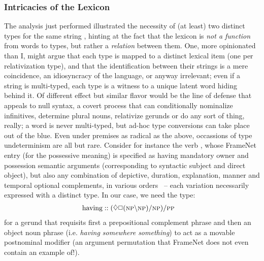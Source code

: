 \subsubsection{Intricacies of the Lexicon}
The analysis just performed illustrated the necessity of (at least) two distinct types for the same string , hinting at the fact that the lexicon is \textit{not a function} from words to types, but rather a \textit{relation} between them.
One, more opinionated than I, might argue that each type is mapped to a distinct lexical item (one per relativization type), and that the identification between their strings is a mere coincidence, an idiosyncracy of the language, or anyway irrelevant; even if a string is multi-typed, each type is a witness to a unique latent word hiding behind it.
Of different effect but similar flavor would be the line of defense that appeals to null syntax, a covert process that can conditionally nominalize infinitives, determine plural nouns, relativize gerunds or do any sort of thing, really; a word is never multi-typed, but ad-hoc type conversions can take place out of the blue.
Even under premises as radical as the above, occassions of type undeterminism are all but rare.
Consider for instance the verb , whose FrameNet entry (for the possessive meaning) is specified as having mandatory owner and possession semantic arguments (corresponding to syntactic subject and direct object), but also any combination of depictive, duration, explanation, manner and temporal optional complements, in various orders~\cite{baker1998berkeley} -- each variation necessarily expressed with a distinct type.
In our case, we need the type:
\begin{align*}
	\w{having} &:: (\diamond\Box(\np\divleft\np)\divright\np)\divright\pp
\end{align*}
for a gerund that requisits first a prepositional complement phrase and then an object noun phrase (i.e. \textit{having somewhere something}) to act as a movable postnominal modifier (an argument permutation that FrameNet does not even contain an example of!).

